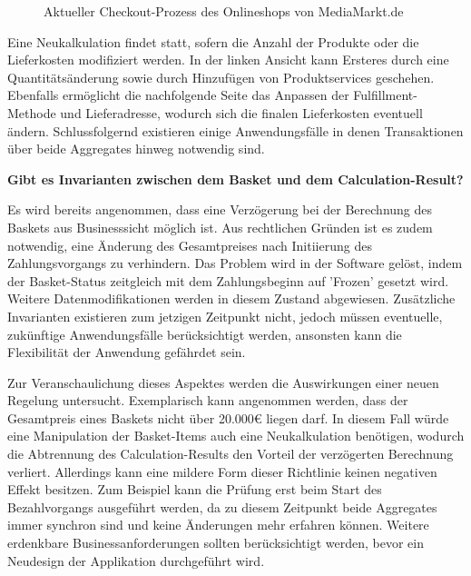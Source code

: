 \vspace{0.5cm}
\begin{figure}[htbp]
	\centering
	\caption{Aktueller Checkout-Prozess des Onlineshops von MediaMarkt.de}
	\label{fig:Checkout-Process}
\end{figure}

Eine Neukalkulation findet statt, sofern die Anzahl der Produkte oder die Lieferkosten modifiziert werden. In der linken Ansicht kann Ersteres durch eine Quantitätsänderung sowie durch Hinzufügen von Produktservices geschehen. Ebenfalls ermöglicht die nachfolgende Seite das Anpassen der Fulfillment-Methode und Lieferadresse, wodurch sich die finalen Lieferkosten eventuell ändern. Schlussfolgernd existieren einige Anwendungsfälle in denen Transaktionen über beide Aggregates hinweg notwendig sind.

\textbf{Gibt es Invarianten zwischen dem Basket und dem Calculation-Result?}

Es wird bereits angenommen, dass eine Verzögerung bei der Berechnung des Baskets aus Businesssicht möglich ist. Aus rechtlichen Gründen ist es zudem notwendig, eine Änderung des Gesamtpreises nach Initiierung des Zahlungsvorgangs zu verhindern. Das Problem wird in der Software gelöst, indem der Basket-Status zeitgleich mit dem Zahlungsbeginn auf 'Frozen' gesetzt wird. Weitere Datenmodifikationen werden in diesem Zustand abgewiesen. Zusätzliche Invarianten existieren zum jetzigen Zeitpunkt nicht, jedoch müssen eventuelle, zukünftige Anwendungsfälle berücksichtigt werden, ansonsten kann die Flexibilität der Anwendung gefährdet sein. 

Zur Veranschaulichung dieses Aspektes werden die Auswirkungen einer neuen Regelung untersucht. Exemplarisch kann angenommen werden, dass der Gesamtpreis eines Baskets nicht über 20.000€ liegen darf. In diesem Fall würde eine Manipulation der Basket-Items auch eine Neukalkulation benötigen, wodurch die Abtrennung des Calculation-Results den Vorteil der verzögerten Berechnung verliert. Allerdings kann eine mildere Form dieser Richtlinie keinen negativen Effekt besitzen. Zum Beispiel kann die Prüfung erst beim Start des Bezahlvorgangs ausgeführt werden, da zu diesem Zeitpunkt beide Aggregates immer synchron sind und keine Änderungen mehr erfahren können. Weitere erdenkbare Businessanforderungen sollten berücksichtigt werden, bevor ein Neudesign der Applikation durchgeführt wird.

